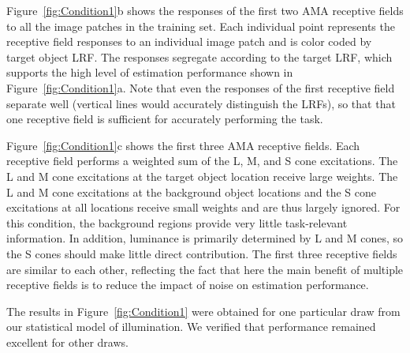 \documentclass{jov}
\begin{document}
Figure~\ref{fig:Condition1}b shows the responses of the first two AMA receptive fields to all the image patches in the training set.
Each individual point represents the receptive field responses to an individual image patch and
is color coded by target object LRF.
The responses segregate according to the target LRF, which supports the high level 
of estimation performance shown in Figure~\ref{fig:Condition1}a.
Note that even the responses of the first receptive field separate well (vertical lines would accurately
distinguish the LRFs), so that that one receptive field is sufficient for accurately performing the task.

Figure~\ref{fig:Condition1}c shows the first three AMA receptive fields.
Each receptive field performs a weighted sum of the L, M, and S cone excitations.
The L and M cone excitations at the target object location receive large weights.
The L and M cone excitations at the background object locations and the S cone excitations at all locations receive small weights and are thus largely ignored. 
For this condition, the background regions provide very little task-relevant information. 
In addition, luminance is primarily determined by L and M cones, so the S cones should make little
direct contribution.
The first three receptive fields are similar to each other, reflecting the fact that here the main benefit
of multiple receptive fields is to reduce the impact of noise on estimation performance.

The results in Figure~\ref{fig:Condition1} were obtained for one particular draw from our statistical model of illumination.
We verified that performance remained excellent for other draws.
\end{document}
